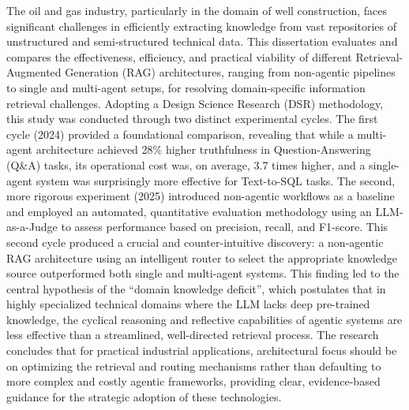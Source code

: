 \documentclass[msc,english]{coppe}
\begin{document}
\begin{abstract}
\end{abstract}
    
\begin{foreignabstract}
    
    The oil and gas industry, particularly in the domain of well construction, faces significant challenges in efficiently extracting knowledge from vast repositories of unstructured and semi-structured technical data. This dissertation evaluates and compares the effectiveness, efficiency, and practical viability of different Retrieval-Augmented Generation (RAG) architectures, ranging from non-agentic pipelines to single and multi-agent setups, for resolving domain-specific information retrieval challenges.
    Adopting a Design Science Research (DSR) methodology, this study was conducted through two distinct experimental cycles. The first cycle (2024) provided a foundational comparison, revealing that while a multi-agent architecture achieved 28\% higher truthfulness in Question-Answering (Q\&A) tasks, its operational cost was, on average, 3.7 times higher, and a single-agent system was surprisingly more effective for Text-to-SQL tasks. The second, more rigorous experiment (2025) introduced non-agentic workflows as a baseline and employed an automated, quantitative evaluation methodology using an LLM-as-a-Judge to assess performance based on precision, recall, and F1-score.
    This second cycle produced a crucial and counter-intuitive discovery: a non-agentic RAG architecture using an intelligent router to select the appropriate knowledge source outperformed both single and multi-agent systems. This finding led to the central hypothesis of the ``domain knowledge deficit'', which postulates that in highly specialized technical domains where the LLM lacks deep pre-trained knowledge, the cyclical reasoning and reflective capabilities of agentic systems are less effective than a streamlined, well-directed retrieval process. The research concludes that for practical industrial applications, architectural focus should be on optimizing the retrieval and routing mechanisms rather than defaulting to more complex and costly agentic frameworks, providing clear, evidence-based guidance for the strategic adoption of these technologies.
    
\end{foreignabstract}


\tableofcontents
\listoffigures
\listoftables
\printlosymbols
\printloabbreviations

\mainmatter



\end{document}

